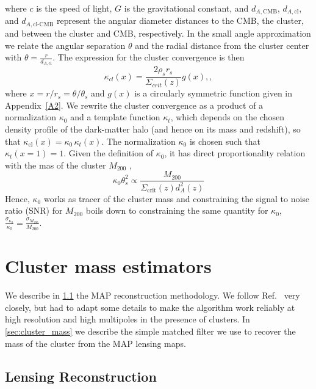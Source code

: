 \documentclass[prd, superscriptaddress, tightenlines, longbibliography, nofootinbib, eqsecnum, amsfonts, amsmath, floatfix, twocolumn, notitlepage]{revtex4-2}
\begin{document}
where $c$ is the speed of light, $G$ is the gravitational constant, and $d_{A,\text{CMB}}$, $d_{A,\text{cl}}$, and $d_{A,\text{cl-CMB}}$ represent the angular diameter distances to the CMB, the cluster, and between the cluster and CMB, respectively. 
In the small angle approximation we relate the angular separation $\theta$ and the radial distance from the cluster center with $\theta = \frac{r}{d_{A,\text{cl}}}$.
The expression for the cluster convergence is then
\begin{equation}
    \kappa_{cl} (x) = \frac{2\rho_s r_s}{\Sigma_{crit}(z)}g(x), ,
\end{equation}
where  $x= r / r_s = \theta / \theta_s$ and $g(x)$ is a circularly symmetric function given in Appendix~\ref{A2}. 
We rewrite the cluster convergence as a product of a normalization $\kappa_0$ and a template function $\kappa_t$, which depends on the chosen density profile of the dark-matter halo (and hence on its mass and redshift), so that $\kappa_{\text{cl}} (x) = \kappa_0 \, \kappa_t (x)$.
The normalization $\kappa_0$ is chosen such that $\kappa_t(x=1) = 1$.
Given the definition of $\kappa_0$, it has direct proportionality relation with the mas of the cluster $M_{200}$ \cite{Zubeldia:2019brr},
\begin{equation}\label{eq:tracer}
    \kappa_0 \theta_s^2 \propto \frac{M_{200}}{\Sigma_{\text{crit}}(z)d_{A}^2(z)}
\end{equation}
Hence, $\kappa_0$ works as tracer of the cluster mass and constraining the signal to noise ratio (SNR) for $M_{200}$ boils down to constraining the same quantity for $\kappa_0$, $\displaystyle \frac{\sigma_{\kappa_0}}{\kappa_0} = \frac{\sigma_{M_{200}}}{M_{200}}$. 

 

\section{Cluster mass estimators}
\label{sec:method}
We describe in \ref{sec:estimators} the MAP reconstruction methodology. We follow  Ref.~\cite{Carron:2017mqf} very closely, but had to adapt some details to make the algorithm work reliably at high resolution and high multipoles in the presence of clusters.
In \ref{sec:cluster_mass} we describe the simple matched filter we use to recover the mass of the cluster from the MAP lensing maps.

\subsection{Lensing Reconstruction}
\label{sec:estimators}
\end{document}
